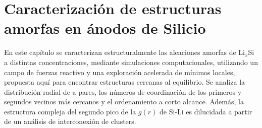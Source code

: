 \chapter[Caracterización de estructuras amorfas en ánodos de Silicio]{
    Caracterización de estructuras amorfas en ánodos de Silicio}
\thispagestyle{empty}

\vspace{50pt}

\begin{adjustwidth}{50pt}{50pt}
    En este capítulo se caracterizan estructuralmente las aleaciones amorfas de
    Li$_x$Si a distintas concentraciones, mediante simulaciones computacionales,
    utilizando un campo de fuerzas reactivo y una exploración acelerada de mínimos
    locales, propuesta aquí para encontrar estructuras cercanas al equilibrio. Se
    analiza la distribución radial de a pares, los números de coordinación de los
    primeros y segundos vecinos más cercanos y el ordenamiento a corto alcance.
    Además, la estructura compleja del segundo pico de la $g(r)$ de Si-Li es 
    dilucidada a partir de un análisis de interconexión de clusters.
\end{adjustwidth}

\clearpage
\newpage
\thispagestyle{empty}
\mbox{}
\newpage












